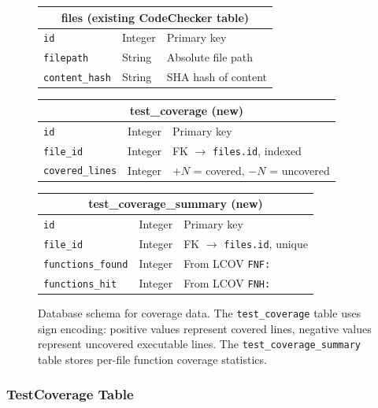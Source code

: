 \begin{figure}[H]
\centering
\begin{tabular}{|l|l|l|}
\hline
\multicolumn{3}{|c|}{\textbf{files} (existing CodeChecker table)} \\
\hline
\texttt{id} & Integer & Primary key \\
\texttt{filepath} & String & Absolute file path \\
\texttt{content\_hash} & String & SHA hash of content \\
\hline
\end{tabular}

\vspace{0.5cm}

\begin{tabular}{|l|l|l|}
\hline
\multicolumn{3}{|c|}{\textbf{test\_coverage} (new)} \\
\hline
\texttt{id} & Integer & Primary key \\
\texttt{file\_id} & Integer & FK $\rightarrow$ \texttt{files.id}, indexed \\
\texttt{covered\_lines} & Integer & $+N$ = covered, $-N$ = uncovered \\
\hline
\end{tabular}

\vspace{0.5cm}

\begin{tabular}{|l|l|l|}
\hline
\multicolumn{3}{|c|}{\textbf{test\_coverage\_summary} (new)} \\
\hline
\texttt{id} & Integer & Primary key \\
\texttt{file\_id} & Integer & FK $\rightarrow$ \texttt{files.id}, unique \\
\texttt{functions\_found} & Integer & From LCOV \texttt{FNF:} \\
\texttt{functions\_hit} & Integer & From LCOV \texttt{FNH:} \\
\hline
\end{tabular}
\caption{Database schema for coverage data. The \texttt{test\_coverage} table uses sign encoding: positive values represent covered lines, negative values represent uncovered executable lines. The \texttt{test\_coverage\_summary} table stores per-file function coverage statistics.}
\label{fig:dbschema}
\end{figure}

\subsubsection{TestCoverage Table}

